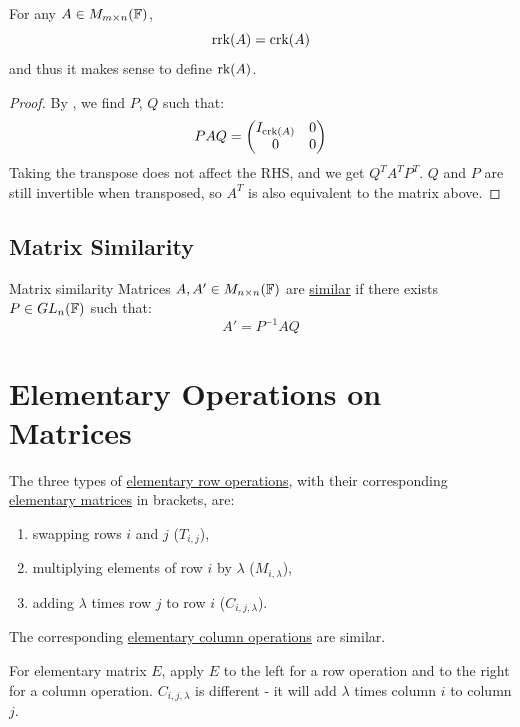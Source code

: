 \documentclass[../Main.tex]{subfiles}
\begin{document}
\begin{theorem}
    For any $A \in M_{m \times n}(\mathbb{F})$,
    \begin{equation*}
        \operatorname{rrk}(A) = \operatorname{crk}(A)
    \end{equation*}
    and thus it makes sense to define $\operatorname{rk}(A)$.
    \label{thmCrkIsRrk}
\end{theorem}
\begin{proof}
    By , we find $P$, $Q$ such that:
    \begin{equation*}
        PAQ =
        \begin{pmatrix}
            I_{\operatorname{crk}(A)} & 0 \\
            0 & 0
        \end{pmatrix}
    \end{equation*}
    Taking the transpose does not affect the RHS, and we get $Q^TA^TP^T$. $Q$ and $P$ are still invertible when transposed, so $A^T$ is also equivalent to the matrix above.
\end{proof}
\subsection{Matrix Similarity}
\begin{definition}{Matrix similarity}
    Matrices $A, A' \in M_{n \times n}(\mathbb{F})$ are \underline{similar} if there exists $P \in GL_n(\mathbb{F})$ such that:
    \begin{equation*}
        A' = P^{-1} A Q
    \end{equation*}
\end{definition}
\section{Elementary Operations on Matrices}
The three types of \underline{elementary row operations}, with their corresponding\\\underline{elementary matrices} in brackets, are:
\begin{enumerate}
    \item swapping rows $i$ and $j$ ($T_{i,j}$),
    \item multiplying elements of row $i$ by $\lambda$ ($M_{i,\lambda}$),
    \item adding $\lambda$ times row $j$ to row $i$ ($C_{i, j, \lambda}$).
\end{enumerate}
The corresponding \underline{elementary column operations} are similar.

For elementary matrix $E$, apply $E$ to the left for a row operation and to the right for a column operation. $C_{i, j, \lambda}$ is different - it will add $\lambda$ times column $i$ to column $j$.
\end{document}
